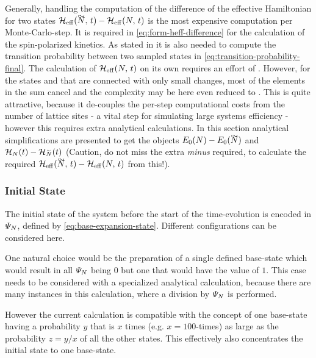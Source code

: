 Generally, handling the computation of the difference of the effective Hamiltonian for two states $\HeffOft[\vphantom{N}\smash{\tilde{N}}]-\HeffOft[N]$ is the most expensive computation per Monte-Carlo-step.
It is required in \autoref{eq:form-heff-difference} for the calculation of the spin-polarized kinetics.
As stated in  it is also needed to compute the transition probability between two sampled states in \autoref{eq:transition-probability-final}.
The calculation of $\HeffOft[N]$ on its own requires an effort of .
However, for the states \ketN[N] and  that are connected with only small changes, most of the elements in the sum cancel and the complexity may be here even reduced to .
This is quite attractive, because it de-couples the per-step computational costs from the number of lattice sites - a vital step for simulating large systems efficiency - however this requires extra analytical calculations.
In this section analytical simplifications are presented to get the objects $E_0(N)-E_0(\vphantom{N}\smash{\tilde{N}})$ and $\HNOft - \HNOft[\vphantom{N}\smash{\tilde{N}}]$ (Caution, do not miss the extra \emph{minus} required, to calculate the required $\HeffOft[\vphantom{N}\smash{\tilde{N}}]-\HeffOft[N]$ from this!).

\subsubsection*{Initial State}

The initial state of the system before the start of the time-evolution is encoded in $\psiN$, defined by \autoref{eq:base-expansion-state}. Different configurations can be considered here.

One natural choice would be the preparation of a single defined base-state which would result in all $\psiN$ being $0$ but one that would have the value of $1$. 
This case needs to be considered with a specialized analytical calculation, because there are many instances in this calculation, where a division by $\psiN$ is performed. 

However the current calculation is compatible with the concept of one base-state having a probability $y$ that is $x$ times (e.g. $x=100$-times) as large as the probability $z = y/x$ of all the other states.
This effectively also concentrates the initial state to one base-state.

